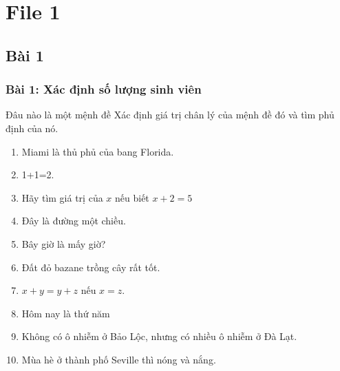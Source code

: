\documentclass[english,10pt,table]{beamer}
\begin{document}


\frame{ \tableofcontents}

\section{File 1}
\subsection{Bài 1}
\frame
{
  \frametitle{Bài 1: Xác định số lượng sinh viên}	
\begin{block}{Đâu nào là một mệnh đề}
Xác định giá trị chân lý của mệnh đề đó và tìm phủ định của nó.
\begin{enumerate}[a]
	\item Miami là thủ phủ của bang Florida.
	\item 1+1=2.
	\item Hãy tìm giá trị của $x$ nếu biết $x+2=5$
	\item Đây là đường một chiều.
	\item Bây giờ là mấy giờ?
	\item Đất đỏ bazane trồng cây rất tốt.
	\item $x+y=y+z$ nếu $x=z$.
	\item Hôm nay là thứ năm
	\item Không có ô nhiễm ở Bảo Lộc, nhưng có nhiều ô nhiễm ở Đà Lạt.
	\item Mùa hè ở thành phố Seville thì nóng và nắng.
\end{enumerate}
\end{block}
}
\end{document}
